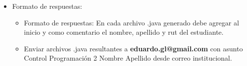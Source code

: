 \documentclass[10pt]{article}
\begin{document}
\begin{itemize}
\item[] Formato de respuestas:
\begin{itemize}
\item Formato de respuestas: En cada archivo .java generado debe agregar al inicio y como comentario el nombre, apellido y rut del estudiante.\item  Enviar archivos .java resultantes  a \textbf{eduardo.gl@gmail.com} con asunto Control Programaci\'on 2 Nombre Apellido desde correo institucional.
\end{itemize}
\end{itemize}
\end{document}
